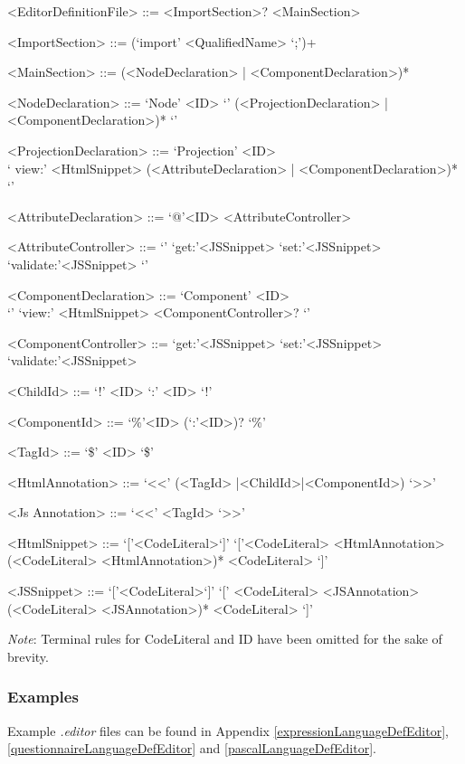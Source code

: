 \documentclass{article}
\begin{document}
\begin{grammar}

<EditorDefinitionFile> ::= <ImportSection>? <MainSection>

<ImportSection> ::= (`import' <QualifiedName> `;')+ 

<MainSection> ::= (<NodeDeclaration> | <ComponentDeclaration>)*

<NodeDeclaration> ::= `Node' <ID> `{' (<ProjectionDeclaration> | <ComponentDeclaration>)* `}'

<ProjectionDeclaration> ::= `Projection' <ID> \\ `{ view:' <HtmlSnippet> (<AttributeDeclaration> | <ComponentDeclaration>)* `}'

<AttributeDeclaration> ::= `@'<ID> <AttributeController>

<AttributeController> ::= `{' `get:'<JSSnippet> `set:'<JSSnippet> `validate:'<JSSnippet> `}'

<ComponentDeclaration> ::= `Component' <ID> \\`{' `view:' <HtmlSnippet> <ComponentController>? `}'

<ComponentController> ::= `get:'<JSSnippet> `set:'<JSSnippet> `validate:'<JSSnippet> 
 
<ChildId> ::= `!' <ID> `:' <ID> `!'
 
<ComponentId> ::= `\%'<ID> (`:'<ID>)? `\%'

<TagId> ::= `\$' <ID> `\$' 

<HtmlAnnotation> ::= `<<' (<TagId> |<ChildId>|<ComponentId>) `>>'

<Js	Annotation> ::= `<<' <TagId> `>>'

<HtmlSnippet> ::= `['<CodeLiteral>`]'
\alt `['<CodeLiteral> <HtmlAnnotation> (<CodeLiteral> <HtmlAnnotation>)*  <CodeLiteral> `]'

<JSSnippet> ::= `['<CodeLiteral>`]'
\alt `[' <CodeLiteral> <JSAnnotation> (<CodeLiteral> <JSAnnotation>)*  <CodeLiteral> `]'


\end{grammar}

\emph{Note}: Terminal rules for CodeLiteral and ID have been omitted for the sake of brevity.

\subsubsection{Examples}
Example \emph{.editor} files can be found in Appendix \ref{expressionLanguageDefEditor}, \ref{questionnaireLanguageDefEditor} and \ref{pascalLanguageDefEditor}.
\end{document}
